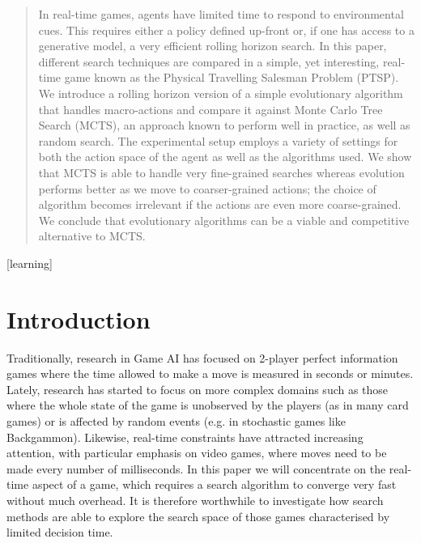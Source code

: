 \documentclass{sig-alternate}
\begin{document}
\maketitle
\begin{abstract}
In real-time games, agents have limited time to respond to environmental cues. This requires either a policy defined up-front or, if one has access to a generative model, a very efficient rolling horizon search. In this paper, different search techniques are compared in a simple, yet interesting, real-time game known as the Physical Travelling Salesman Problem (PTSP). We introduce a rolling horizon version of a simple evolutionary algorithm that handles macro-actions and compare it against Monte Carlo Tree Search (MCTS), an approach known to perform well in practice, as well as random search. The experimental setup employs a variety of settings for both the action space of the agent as well as the algorithms used. We show that MCTS is able to handle very fine-grained searches whereas evolution performs better as we move to coarser-grained actions; the choice of algorithm becomes irrelevant if the actions are even more coarse-grained. We conclude that evolutionary algorithms can be a viable and competitive alternative to MCTS. 
\end{abstract}

[learning]



\section{Introduction}

Traditionally, research in Game AI has focused on 2-player perfect information games where the time allowed to make a move is measured in seconds or minutes. Lately, research has started to focus on more complex domains such as those where the whole state of the game is unobserved by the players (as in many card games) or is affected by random events (e.g. in stochastic games like Backgammon). Likewise, real-time constraints have attracted increasing attention, with particular emphasis on video games, where moves need to be made every number of milliseconds. In this paper we will concentrate on the real-time aspect of a game, which requires a search algorithm to converge very fast without much overhead. It is therefore worthwhile to investigate how search methods are able to explore the search space of those games characterised by limited decision time.
\end{document}
